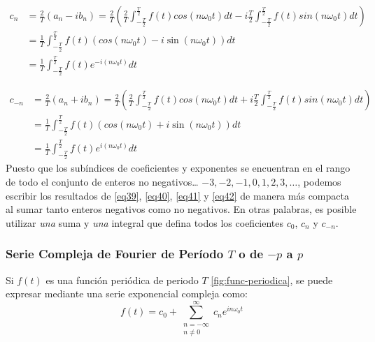 \begin{equation} \label{eq41}
	\begin{split}
		c_n &= \frac{2}{T} \left(a_n - i b_n\right) = \frac{2}{T} \left(\frac{2}{T} \int_{-\frac{T}{2}}^{\frac{T}{2}} f(t) cos(n\omega_0 t)  dt - i \frac{T}{2} \int_{-\frac{T}{2}}^{\frac{T}{2}} f(t) sin(n\omega_0 t) dt\right) \\
		&=  \frac{1}{T} \int_{-\frac{T}{2}}^{\frac{T}{2}} f(t) \left( cos(n\omega_0 t)  - i \sin (n\omega_0 t)  \right) dt \\
		&= \frac{1}{T} \int_{-\frac{T}{2}}^{\frac{T}{2}} f(t) e^{-i (n\omega_0 t)}  dt		
	\end{split}
\end{equation}

\begin{equation} \label{eq42}
	\begin{split}
		c_{-n} &= \frac{2}{T} \left(a_n + i b_n\right) = \frac{2}{T} \left(\frac{2}{T} \int_{-\frac{T}{2}}^{\frac{T}{2}} f(t) cos(n\omega_0 t)  dt + i \frac{T}{2} \int_{-\frac{T}{2}}^{\frac{T}{2}} f(t) sin(n\omega_0 t) dt\right) \\
		&=  \frac{1}{T} \int_{-\frac{T}{2}}^{\frac{T}{2}} f(t) \left( cos(n\omega_0 t)  + i \sin (n\omega_0 t)  \right) dt \\
		&= \frac{1}{T} \int_{-\frac{T}{2}}^{\frac{T}{2}} f(t) e^{i (n\omega_0 t)}  dt		
	\end{split}
\end{equation}
Puesto que los subíndices de coeficientes y exponentes se encuentran en el rango de todo el conjunto de enteros no negativos… $-3, -2, -1, 0, 1, 2, 3, \dots$, podemos escribir los resultados de \eqref{eq39}, \eqref{eq40}, \eqref{eq41} y \eqref{eq42} de manera más compacta al sumar tanto enteros negativos como no negativos. En otras palabras, es posible utilizar \textit{una} suma y \textit{una} integral que defina todos los coeficientes $c_0$, $c_n$ y $c_{-n}$. ~\cite{matesAvanzadasZill}


\subsubsection{Serie Compleja de Fourier de Período $T$ o de $-p$ a $p$}
Si $f(t)$ es una función periódica de periodo $T$ \ref{fig:func-periodica}, se puede expresar mediante una serie exponencial compleja como: ~\cite{fourierHsu}
\begin{equation}\label{eq45}
	f(t) = c_0 + \sum_{\substack{n=-\infty \\ n \neq 0}}^{\infty} c_n e^{i n \omega_0 t}
\end{equation}



